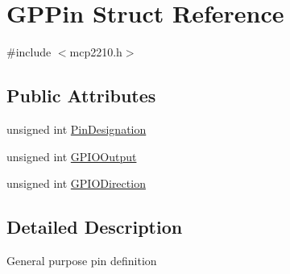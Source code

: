 \hypertarget{struct_g_p_pin}{\section{\-G\-P\-Pin \-Struct \-Reference}
\label{struct_g_p_pin}
}


{\ttfamily \#include $<$mcp2210.\-h$>$}

\subsection*{\-Public \-Attributes}
\begin{DoxyCompactItemize}
\item 
unsigned int \hyperlink{struct_g_p_pin_a3d0225b44b50d426354e47851f246ab9}{\-Pin\-Designation}
\item 
unsigned int \hyperlink{struct_g_p_pin_a1fffec9bada958b64937f51655c569e4}{\-G\-P\-I\-O\-Output}
\item 
unsigned int \hyperlink{struct_g_p_pin_a67735613380d11c71a1a447c7459bc6d}{\-G\-P\-I\-O\-Direction}
\end{DoxyCompactItemize}


\subsection{\-Detailed \-Description}
\-General purpose pin definition 

